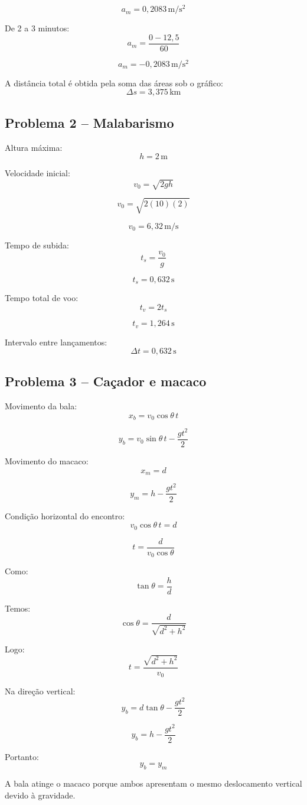 \documentclass[12pt,a4paper]{article}
\begin{document}
\[
\boxed{a_m=0,2083\,\mathrm{m/s^2}}
\]

De 2 a 3 minutos:
\[
a_m=\frac{0-12,5}{60}
\]

\[
\boxed{a_m=-0,2083\,\mathrm{m/s^2}}
\]

A distância total é obtida pela soma das áreas sob o gráfico:
\[
\boxed{\Delta s=3,375\,\mathrm{km}}
\]

\subsection{Problema 2 -- Malabarismo}

Altura máxima:
\[
h=2\,\mathrm{m}
\]

Velocidade inicial:
\[
v_0=\sqrt{2gh}
\]

\[
v_0=\sqrt{2(10)(2)}
\]

\[
\boxed{v_0=6,32\,\mathrm{m/s}}
\]

Tempo de subida:
\[
t_s=\frac{v_0}{g}
\]

\[
\boxed{t_s=0,632\,\mathrm{s}}
\]

Tempo total de voo:
\[
t_v=2t_s
\]

\[
\boxed{t_v=1,264\,\mathrm{s}}
\]

Intervalo entre lançamentos:
\[
\boxed{\Delta t=0,632\,\mathrm{s}}
\]

\subsection{Problema 3 -- Caçador e macaco}

Movimento da bala:
\[
x_b=v_0\cos\theta\,t
\]

\[
y_b=v_0\sin\theta\,t-\frac{gt^2}{2}
\]

Movimento do macaco:
\[
x_m=d
\]

\[
y_m=h-\frac{gt^2}{2}
\]

Condição horizontal do encontro:
\[
v_0\cos\theta\,t=d
\]

\[
t=\frac{d}{v_0\cos\theta}
\]

Como:
\[
\tan\theta=\frac{h}{d}
\]

Temos:
\[
\cos\theta=\frac{d}{\sqrt{d^2+h^2}}
\]

Logo:
\[
\boxed{
t=\frac{\sqrt{d^2+h^2}}{v_0}
}
\]

Na direção vertical:
\[
y_b=d\tan\theta-\frac{gt^2}{2}
\]

\[
y_b=h-\frac{gt^2}{2}
\]

Portanto:
\[
\boxed{y_b=y_m}
\]

A bala atinge o macaco porque ambos apresentam
o mesmo deslocamento vertical devido à gravidade.
\end{document}
